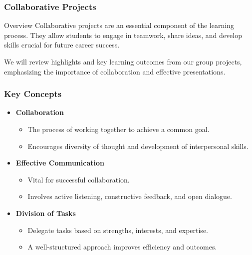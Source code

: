 \documentclass[aspectratio=169]{beamer}
\begin{document}
\begin{frame}[fragile]
    \frametitle{Collaborative Projects}
    \begin{block}{Overview}
        Collaborative projects are an essential component of the learning process. They allow students to engage in teamwork, share ideas, and develop skills crucial for future career success. 
    \end{block}
    We will review highlights and key learning outcomes from our group projects, emphasizing the importance of collaboration and effective presentations.
\end{frame}

\begin{frame}[fragile]
    \frametitle{Key Concepts}
    \begin{itemize}
        \item \textbf{Collaboration}
            \begin{itemize}
                \item The process of working together to achieve a common goal.
                \item Encourages diversity of thought and development of interpersonal skills.
            \end{itemize}
        \item \textbf{Effective Communication}
            \begin{itemize}
                \item Vital for successful collaboration.
                \item Involves active listening, constructive feedback, and open dialogue.
            \end{itemize}
        \item \textbf{Division of Tasks}
            \begin{itemize}
                \item Delegate tasks based on strengths, interests, and expertise.
                \item A well-structured approach improves efficiency and outcomes.
            \end{itemize}
    \end{itemize}
\end{frame}
\end{document}
